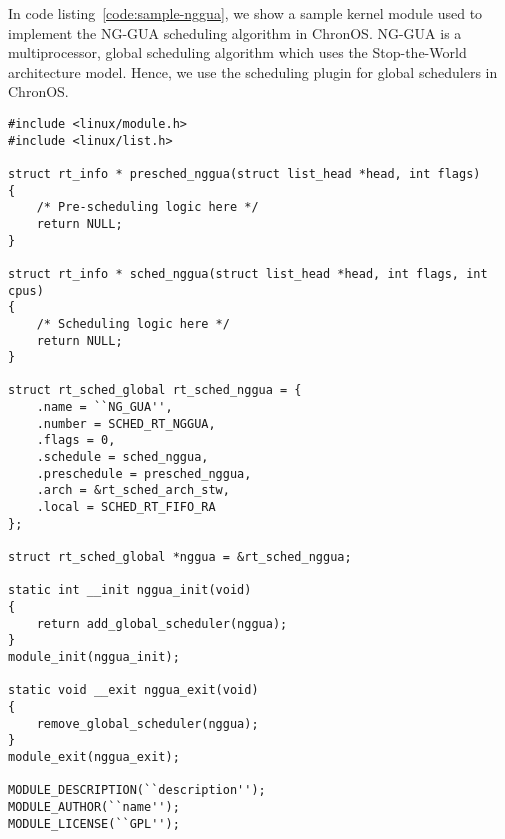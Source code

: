 \documentclass[12pt,dvips]{report}
\begin{document}
In code listing~\ref{code:sample-nggua}, we show a sample kernel module used to implement the NG-GUA scheduling algorithm in ChronOS. NG-GUA is a multiprocessor, global scheduling algorithm which uses the Stop-the-World architecture model. Hence, we use the scheduling plugin for global schedulers in ChronOS.
~\\
\begin{lstlisting}[caption=Sample kernel module for NG-GUA, label=code:sample-nggua]
#include <linux/module.h>
#include <linux/list.h>

struct rt_info * presched_nggua(struct list_head *head, int flags)
{
	/* Pre-scheduling logic here */
	return NULL;
}

struct rt_info * sched_nggua(struct list_head *head, int flags, int cpus)
{
	/* Scheduling logic here */
	return NULL;
}

struct rt_sched_global rt_sched_nggua = {
	.name = ``NG_GUA'',
	.number = SCHED_RT_NGGUA,
	.flags = 0,
	.schedule = sched_nggua,
	.preschedule = presched_nggua,
	.arch = &rt_sched_arch_stw,
	.local = SCHED_RT_FIFO_RA
};

struct rt_sched_global *nggua = &rt_sched_nggua;

static int __init nggua_init(void)
{
	return add_global_scheduler(nggua);
}
module_init(nggua_init);

static void __exit nggua_exit(void)
{
	remove_global_scheduler(nggua);
}
module_exit(nggua_exit);

MODULE_DESCRIPTION(``description'');
MODULE_AUTHOR(``name'');
MODULE_LICENSE(``GPL'');
\end{lstlisting}

\newpage
{}



\end{document}
